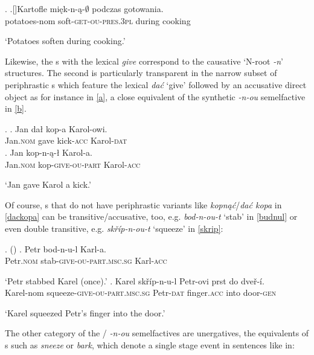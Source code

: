 \ex. 
\ag.[]\hspace{-22pt}Kartofle mi\k{e}k-n-\k{a}-$\emptyset$ podczas gotowania.\\
\hspace{-22pt}potatoes-{\sc nom} soft-\textsc{get}-\textsc{ou}-\textsc{pres.3pl} during cooking\\
\hspace{-22pt}\strut `Potatoes soften during cooking.'

\noindent
Likewise, the  s with the lexical \textit{give} correspond to the causative `N-root \textit{-n}' structures. The second is particularly transparent in the narrow subset of  periphrastic s which feature the lexical  \textit{da\'c} `give' followed by an accusative direct object as for instance in \ref{a}, a close equivalent of the synthetic \textit{-n-ou} semelfactive in \ref{b}.\pagebreak


\ex. \label{dackopa}
\ag. Jan da\l {} kop-a Karol-owi.\label{a}\\
Jan.\textsc{nom} gave  kick-\textsc{acc} Karol-\textsc{dat}\\
\bg. Jan kop-n-\k{a}-\l {} Karol-a.\label{b}\\
Jan.\textsc{nom} kop-\textsc{give-ou-part} Karol-\textsc{acc}\\
\strut `Jan gave Karol a kick.'\label{Karol}

Of course, s that do not have periphrastic variants like \textit{kopn\k{a}\'c}/\textit{da\'c kopa} in \ref{dackopa} can be transitive/accusative, too, e.g. \textit{bod-n-ou-t} `stab' in \ref{budnul} or even  double transitive, e.g. \textit{sk\v{r}\'ip-n-ou-t} `squeeze' in \ref{skrip}:

\ex.  (\citealt[ex. 82]{NU})
\ag.
Petr bod-n-u-l Karl-a. \\
Petr\textsc{.nom} stab-\textsc{give}-\textsc{ou}-\textsc{part.msc.sg} Karl-\textsc{acc}\\
\strut `Petr stabbed Karel (once).'\label{budnul}
\bg. 
Karel sk\v r\'ip-n-u-l Petr-ovi prst do dve\v{r}-\'i. \\
Karel-{\sc nom} squeeze-\textsc{give}-\textsc{ou}-\textsc{part.msc.sg} Petr-\textsc{dat} finger.\textsc{acc} into door-\textsc{gen} \\ 
\strut `Karel squeezed Petr's finger into the door.'\label{skrip}
 
\noindent The other category of the / \textit{-n-ou} semelfactives are unergatives, the equivalents of  s such as \textit{sneeze} or \textit{bark}, which denote a single stage event in sentences like in:

